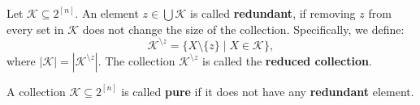 \documentclass{beamer}
\begin{document}
\begin{frame}
	\begin{definition}
		Let \( \mathcal{K} \subseteq 2^{[n]} \). An element \( z \in \bigcup \mathcal{K} \) is called \textbf{redundant}, if removing \( z \) from every set in \( \mathcal{K} \) does not change the size of the collection. Specifically, we define:
		\[
			\mathcal{K}^{\setminus z} = \{X \setminus \{z\} \mid X \in \mathcal{K}\},
		\]
		where \( |\mathcal{K}| = |\mathcal{K}^{\setminus z}| \). The collection \( \mathcal{K}^{\setminus z} \) is called the \textbf{reduced collection}.
	\end{definition}
	\pause
	\vfill

	\begin{definition}
		A collection \(\mathcal{K} \subseteq 2^{[n]}\) is called \textbf{pure} if it does not have any \textbf{redundant} element.
	\end{definition}
\end{frame}
\end{document}
